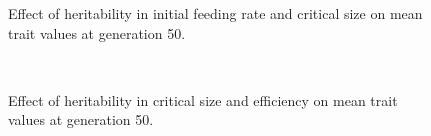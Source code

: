 \begin{figure}[p]
{  }
  \caption{Effect of heritability in initial feeding rate and critical size on mean trait values at generation 50.}
  \label{fig:hrt_fr_mc}
\end{figure}
\begin{figure}[p]
  \\
  \caption{Effect of heritability in critical size and efficiency on mean trait values at generation 50.}
  \label{fig:hrt_mc_eff}
\end{figure}
\pagebreak
